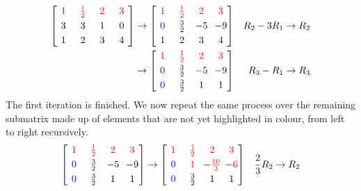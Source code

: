 \begin{solution}
\begin{align*}
\left[\begin{array}{@{\,}wc{10pt}wc{10pt}wc{10pt}wc{10pt}@{\,}}
\mathcolor{red}{1} & \mathcolor{red}{\frac{1}{2}} & \mathcolor{red}{2} & \mathcolor{red}{3} \\[3pt]
3 & 3 & 1 & 0 \\[3pt]
1 & 2 & 3 & 4
\end{array}\right]
&\to
\left[\begin{array}{@{\,}wc{10pt}wc{10pt}wc{10pt}wc{10pt}@{\,}}
\mathcolor{red}{1} & \mathcolor{red}{\frac{1}{2}} & \mathcolor{red}{2} & \mathcolor{red}{3} \\[3pt]
\mathcolor{blue}{0} & \frac{3}{2} & -5 & -9 \\[3pt]
1 & 2 & 3 & 4
\end{array}\right]
& R_2-3R_1 \to R_2 \\
&\to
\left[\begin{array}{@{\,}wc{10pt}wc{10pt}wc{10pt}wc{10pt}@{\,}}
\mathcolor{red}{1} & \mathcolor{red}{\frac{1}{2}} & \mathcolor{red}{2} & \mathcolor{red}{3} \\[3pt]
\mathcolor{blue}{0} & \frac{3}{2} & -5 & -9 \\[3pt]
\mathcolor{blue}{0} & \frac{3}{2} & 1 & 1
\end{array}\right]
& R_3-R_1 \to R_3
\end{align*}
The first iteration is finished. We now repeat the same process over the remaining submatrix made up of elements that are not yet highlighted in colour, from left to right recursively.
\begin{align*}
\left[\begin{array}{@{\,}wc{10pt}wc{10pt}wc{10pt}wc{10pt}@{\,}}
\mathcolor{red}{1} & \mathcolor{red}{\frac{1}{2}} & \mathcolor{red}{2} & \mathcolor{red}{3} \\[3pt]
\mathcolor{blue}{0} & \frac{3}{2} & -5 & -9 \\[3pt]
\mathcolor{blue}{0} & \frac{3}{2} & 1 & 1
\end{array}\right]
&\to
\left[\begin{array}{@{\,}wc{10pt}wc{10pt}wc{10pt}wc{10pt}@{\,}}
\mathcolor{red}{1} & \mathcolor{red}{\frac{1}{2}} & \mathcolor{red}{2} & \mathcolor{red}{3} \\[3pt]
\mathcolor{blue}{0} & \mathcolor{red}{1} & \mathcolor{red}{-\frac{10}{3}} & \mathcolor{red}{-6} \\[3pt]
\mathcolor{blue}{0} & \frac{3}{2} & 1 & 1
\end{array}\right]
& \frac{2}{3}R_2 \to R_2 \\

\end{align*}
\end{solution}
